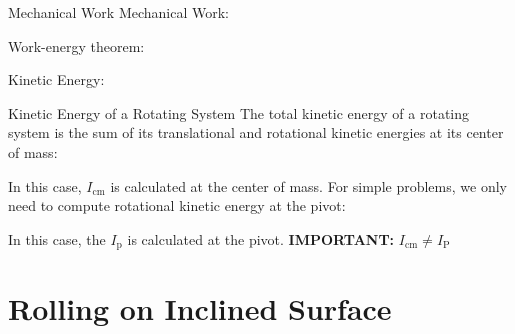 \documentclass[12pt,compress,aspectratio=169]{beamer}
\begin{document}
\begin{frame}{Mechanical Work}
  Mechanical Work:


  Work-energy theorem:


  Kinetic Energy:
  
\end{frame}


\begin{frame}{Kinetic Energy of a Rotating System}
  The total kinetic energy of a rotating system is the sum of its translational
  and rotational kinetic energies at its center of mass:

  
  In this case, $I_\text{cm}$ is calculated at the center of mass. For simple
  problems, we only need to compute rotational kinetic energy at the pivot:

  
  In this case, the $I_\text{p}$ is calculated at the pivot.
  \textbf{IMPORTANT:} $I_\text{cm}\neq I_\text{P}$
\end{frame}



\section{Rolling on Inclined Surface}
\end{document}
